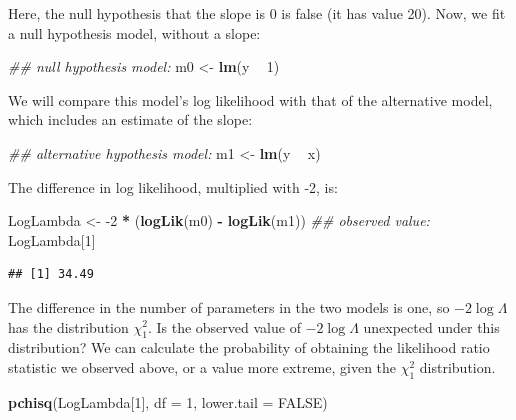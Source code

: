 \documentclass[12pt,]{krantz}
\newenvironment{Shaded}{\begin{snugshade}}{\end{snugshade}}
\newcommand{\CommentTok}[1]{\textcolor[rgb]{0.56,0.35,0.01}{\textit{#1}}}
\newcommand{\DataTypeTok}[1]{\textcolor[rgb]{0.13,0.29,0.53}{#1}}
\newcommand{\DecValTok}[1]{\textcolor[rgb]{0.00,0.00,0.81}{#1}}
\newcommand{\KeywordTok}[1]{\textcolor[rgb]{0.13,0.29,0.53}{\textbf{#1}}}
\newcommand{\NormalTok}[1]{#1}
\newcommand{\OperatorTok}[1]{\textcolor[rgb]{0.81,0.36,0.00}{\textbf{#1}}}
\newcommand{\OtherTok}[1]{\textcolor[rgb]{0.56,0.35,0.01}{#1}}
\newcommand{\StringTok}[1]{\textcolor[rgb]{0.31,0.60,0.02}{#1}}
\begin{document}
Here, the null hypothesis that the slope is 0 is false (it has value 20). Now, we fit a null hypothesis model, without a slope:

\begin{Shaded}
\begin{Highlighting}[]
\CommentTok{## null hypothesis model:}
\NormalTok{m0 <-}\StringTok{ }\KeywordTok{lm}\NormalTok{(y }\OperatorTok{~}\StringTok{ }\DecValTok{1}\NormalTok{)}
\end{Highlighting}
\end{Shaded}

We will compare this model's log likelihood with that of the alternative model, which includes an estimate of the slope:

\begin{Shaded}
\begin{Highlighting}[]
\CommentTok{## alternative hypothesis model:}
\NormalTok{m1 <-}\StringTok{ }\KeywordTok{lm}\NormalTok{(y }\OperatorTok{~}\StringTok{ }\NormalTok{x)}
\end{Highlighting}
\end{Shaded}

The difference in log likelihood, multiplied with -2, is:

\begin{Shaded}
\begin{Highlighting}[]
\NormalTok{LogLambda <-}\StringTok{ }\DecValTok{-2} \OperatorTok{*}\StringTok{ }\NormalTok{(}\KeywordTok{logLik}\NormalTok{(m0) }\OperatorTok{-}\StringTok{ }\KeywordTok{logLik}\NormalTok{(m1))}
\CommentTok{## observed value:}
\NormalTok{LogLambda[}\DecValTok{1}\NormalTok{]}
\end{Highlighting}
\end{Shaded}

\begin{verbatim}
## [1] 34.49
\end{verbatim}

The difference in the number of parameters in the two models is one, so \(-2\log\Lambda\) has the distribution \(\chi_1^2\). Is the observed value of \(-2\log\Lambda\) unexpected under this distribution? We can calculate the probability of obtaining the likelihood ratio statistic we observed above, or a value more extreme, given the \(\chi_1^2\) distribution.

\begin{Shaded}
\begin{Highlighting}[]
\KeywordTok{pchisq}\NormalTok{(LogLambda[}\DecValTok{1}\NormalTok{], }\DataTypeTok{df =} \DecValTok{1}\NormalTok{, }\DataTypeTok{lower.tail =} \OtherTok{FALSE}\NormalTok{)}
\end{Highlighting}
\end{Shaded}
\end{document}
